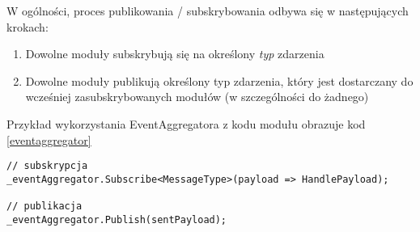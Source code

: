 W ogólności, proces publikowania / subskrybowania odbywa się w następujących krokach:
\begin{enumerate}
 \item Dowolne moduły subskrybują się na określony \textit{typ} zdarzenia
 \item Dowolne moduły publikują określony typ zdarzenia, który jest dostarczany do wcześniej zasubskrybowanych modułów (w szczególności do żadnego)
\end{enumerate}

Przykład wykorzystania EventAggregatora z kodu modułu obrazuje kod \ref{eventaggregator}
\label{eventaggregator}
\begin{lstlisting}[frame=tb]
// subskrypcja
_eventAggregator.Subscribe<MessageType>(payload => HandlePayload);

// publikacja
_eventAggregator.Publish(sentPayload);
\end{lstlisting}


